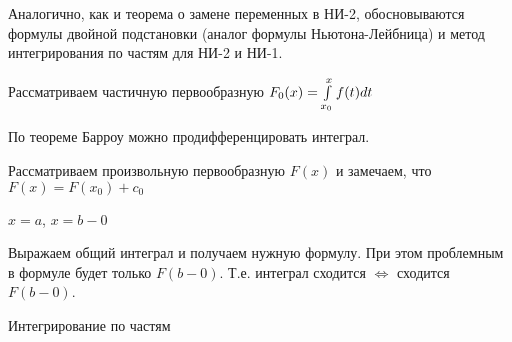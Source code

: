 \begin{col-answer-preambule}
		Аналогично, как и теорема о замене переменных в НИ-2, обосновываются формулы двойной подстановки (аналог формулы Ньютона-Лейбница) и метод интегрирования по частям для НИ-2 и НИ-1.
\end{col-answer-preambule}

\begin{plan}
\item Рассматриваем частичную первообразную $F_0(x) = \int\limits_{x_0}^xf(t)dt$
\item По теореме Барроу можно продифференцировать интеграл.
\item Рассматриваем произвольную первообразную $F(x)$ и замечаем, что $F(x) = F(x_0) + c_0$
\item $x = a$, $x = b - 0$
\item Выражаем общий интеграл и получаем нужную формулу. При этом проблемным в формуле будет только $F(b-0)$. Т.е. интеграл сходится $\Leftrightarrow$ сходится $F(b-0)$.
\end{plan}
Интегрирование по частям


